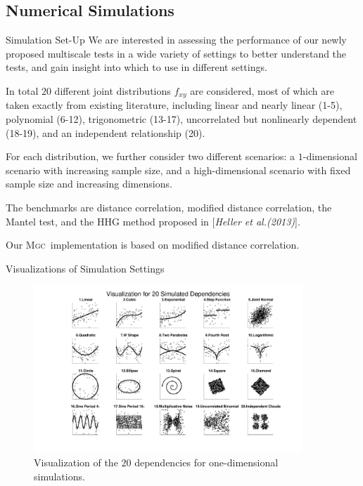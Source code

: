 \documentclass{beamer}
\providecommand{\sct}[1]{{\normalfont\textsc{#1}}}
\newcommand{\Mgc}{\sct{Mgc}}
\begin{document}
\subsection{Numerical Simulations}
\begin{frame}{Simulation Set-Up}
We are interested in assessing the performance of our newly proposed multiscale tests in a wide variety of settings to better understand the tests, and gain insight into which to use in different settings. 

\pause
\medskip
In total $20$ different joint distributions $f_{xy}$ are considered, most of which are taken exactly from existing literature, including linear and nearly linear  (1-5), polynomial   (6-12), trigonometric (13-17), uncorrelated but nonlinearly dependent  (18-19), and an independent relationship (20).

\pause
\medskip
For each distribution, we further consider two different scenarios: a $1$-dimensional scenario with increasing sample size, and a high-dimensional scenario with fixed sample size and increasing dimensions.

\pause
\medskip
The benchmarks are distance correlation, modified distance correlation, the Mantel test, and the HHG method proposed in [\textit{Heller et al.(2013)}]\cite{HellerGorfine2013}.

\pause
\medskip
Our \Mgc~implementation is based on modified distance correlation.

\end{frame}

\begin{frame}{Visualizations of Simulation Settings}
\begin{figure}[ht]
  \centering
  \includegraphics[width=0.9\textwidth]{../Figures/FigSimVisual}
	\caption{Visualization of the $20$ dependencies for one-dimensional simulations. 
}
	\label{f:dependencies}
\end{figure}
\end{frame}
\end{document}
